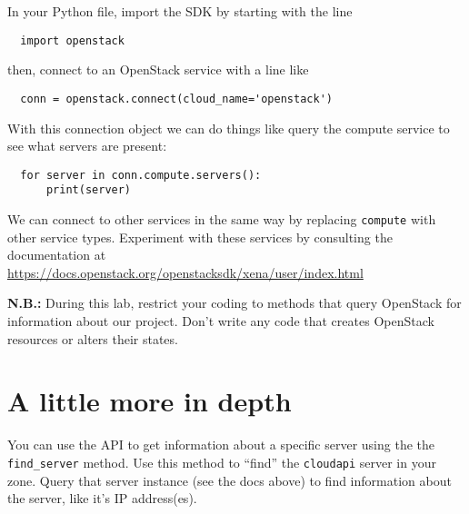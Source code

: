\documentclass{article}
\begin{document}
In your Python file, import the SDK by starting with the line

\begin{verbatim}
  import openstack
\end{verbatim}

then, connect to an OpenStack service with a line like

\begin{verbatim}
  conn = openstack.connect(cloud_name='openstack')
\end{verbatim}

With this connection object we can do things like query the compute service to see what servers are present:

\begin{verbatim}
  for server in conn.compute.servers():
      print(server)
\end{verbatim}

We can connect to other services in the same way by replacing \texttt{compute} with other service types. Experiment with these services by consulting the documentation at \url{https://docs.openstack.org/openstacksdk/xena/user/index.html}

\textbf{N.B.:} During this lab, restrict your coding to methods that query OpenStack for information about our project. Don't write any code that creates OpenStack resources or alters their states.

\section{A little more in depth}
You can use the API to get information about a specific server using the the \texttt{find\_server} method. Use this method to ``find'' the \texttt{cloudapi} server in your zone. Query that server instance (see the docs above) to find information about the server, like it's IP address(es).
\end{document}
